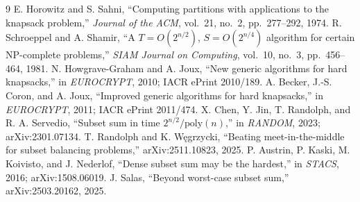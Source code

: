 \documentclass[conference]{IEEEtran}
\begin{document}
\begin{thebibliography}{9}
 E. Horowitz and S. Sahni, ``Computing partitions with applications
to the knapsack problem,'' \emph{Journal of the ACM}, vol.~21, no.~2,
pp.~277--292, 1974.
 R. Schroeppel and A. Shamir, ``A $T=O(2^{n/2})$, $S=O(2^{n/4})$
algorithm for certain NP-complete problems,'' \emph{SIAM Journal on Computing},
vol.~10, no.~3, pp.~456--464, 1981.
 N. Howgrave-Graham and A. Joux, ``New generic algorithms for hard
knapsacks,'' in \emph{EUROCRYPT}, 2010; IACR ePrint 2010/189.
 A. Becker, J.-S. Coron, and A. Joux, ``Improved generic algorithms
for hard knapsacks,'' in \emph{EUROCRYPT}, 2011; IACR ePrint 2011/474.
 X. Chen, Y. Jin, T. Randolph, and R. A. Servedio, ``Subset sum
in time $2^{n/2}/\mathrm{poly}(n)$,'' in \emph{RANDOM}, 2023; arXiv:2301.07134.
 T. Randolph and K. W\k{e}grzycki, ``Beating meet-in-the-middle for
subset balancing problems,'' arXiv:2511.10823, 2025.
 P. Austrin, P. Kaski, M. Koivisto, and J. Nederlof, ``Dense subset
sum may be the hardest,'' in \emph{STACS}, 2016; arXiv:1508.06019.
 J. Salas, ``Beyond worst-case subset sum,'' arXiv:2503.20162,
2025.
\end{thebibliography}
\end{document}
